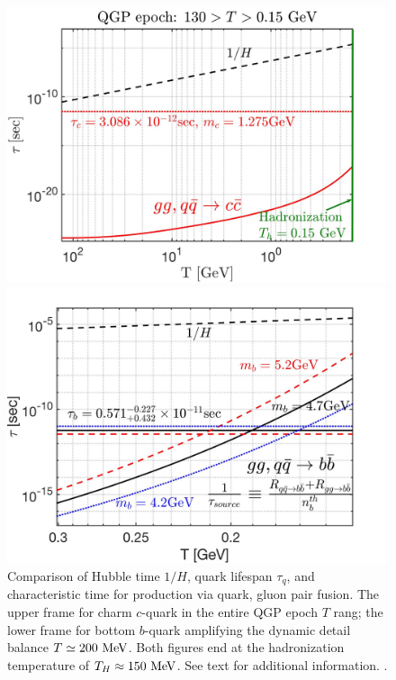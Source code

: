 \begin{figure} 
\centerline{\includegraphics[width=0.9\linewidth]{./plots/CharmQuark_QGP.jpg}}
\centerline{\includegraphics[width=0.9\linewidth]{./plots/BQuarkReactionTime_bottom.jpg}}
\caption{Comparison of Hubble time $1/H$, quark lifespan $\tau_{q}$, and characteristic time for production via quark, gluon pair fusion. The upper frame for charm $c$-quark in the entire QGP epoch $T$ rang; the lower frame for bottom $b$-quark amplifying the dynamic detail balance $T\simeq 200\text{ MeV}$. Both figures end at the hadronization temperature of $T_{H}\approx150\text{ MeV}$. See text for additional information. . }
\label{BCreaction:fig}
\end{figure}

